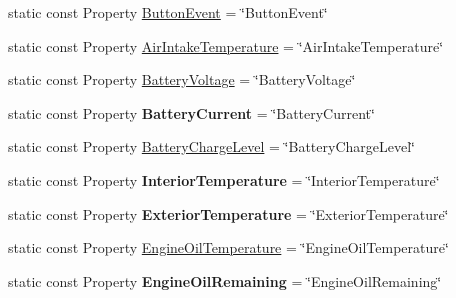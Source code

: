 \begin{DoxyCompactItemize}
\item 
static const Property \hyperlink{classVehicleProperty_ab9fa252d209fbd2eb014c4d934d3d615}{Button\-Event} = \char`\"{}Button\-Event\char`\"{}
\item 
static const Property \hyperlink{classVehicleProperty_af4cbbae11228729335c50aa2d1fa2e28}{Air\-Intake\-Temperature} = \char`\"{}Air\-Intake\-Temperature\char`\"{}
\item 
static const Property \hyperlink{classVehicleProperty_a43a70a277b955ae35a9ba795d2052591}{Battery\-Voltage} = \char`\"{}Battery\-Voltage\char`\"{}
\item 
\hypertarget{classVehicleProperty_a3447a00e8ca09d12b208bc7c210a61b8}{static const Property {\bfseries Battery\-Current} = \char`\"{}Battery\-Current\char`\"{}}\label{classVehicleProperty_a3447a00e8ca09d12b208bc7c210a61b8}

\item 
static const Property \hyperlink{classVehicleProperty_a71025201c20a84f3303b32b08872113a}{Battery\-Charge\-Level} = \char`\"{}Battery\-Charge\-Level\char`\"{}
\item 
\hypertarget{classVehicleProperty_adbbb68033f8531903ff3e3024864eef3}{static const Property {\bfseries Interior\-Temperature} = \char`\"{}Interior\-Temperature\char`\"{}}\label{classVehicleProperty_adbbb68033f8531903ff3e3024864eef3}

\item 
\hypertarget{classVehicleProperty_ad9510186dc9ef236b59743371f093d36}{static const Property {\bfseries Exterior\-Temperature} = \char`\"{}Exterior\-Temperature\char`\"{}}\label{classVehicleProperty_ad9510186dc9ef236b59743371f093d36}

\item 
static const Property \hyperlink{classVehicleProperty_a9d4a610d94b12f139ea00b271804a73f}{Engine\-Oil\-Temperature} = \char`\"{}Engine\-Oil\-Temperature\char`\"{}
\item 
\hypertarget{classVehicleProperty_aeeece192dedcd20cb112dea6905aa80c}{static const Property {\bfseries Engine\-Oil\-Remaining} = \char`\"{}Engine\-Oil\-Remaining\char`\"{}}\label{classVehicleProperty_aeeece192dedcd20cb112dea6905aa80c}


\end{DoxyCompactItemize}
